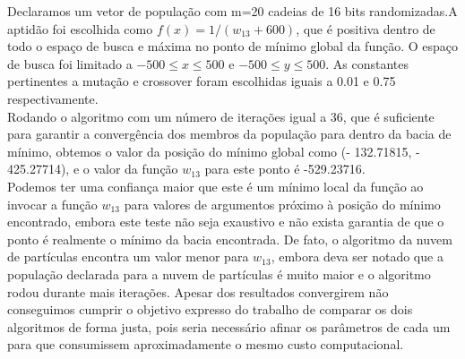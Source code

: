 
Declaramos um vetor de população com m=20 cadeias de 16 bits randomizadas.A aptidão foi escolhida como $f(x) = 1/(w_{13}+600)$, que é positiva dentro de todo o espaço de busca e máxima no ponto de mínimo global da função. O espaço de busca foi limitado a $-500 \leq x \leq 500$ e $-500 \leq y \leq 500$. As constantes pertinentes a mutação e crossover foram escolhidas iguais a 0.01 e 0.75 respectivamente.\\

Rodando o algoritmo com um número de iterações igual a 36, que é suficiente para garantir a convergência dos membros da população para dentro da bacia de mínimo, obtemos o valor da posição do mínimo global como (- 132.71815, - 425.27714), e o valor da função $w_{13}$ para este ponto é -529.23716.\\

Podemos ter uma confiança maior que este é um mínimo local da função ao invocar a função $w_{13}$ para valores de argumentos próximo à posição do mínimo encontrado, embora este teste não seja exaustivo e não exista garantia de que o ponto é realmente o mínimo da bacia encontrada. De fato, o algoritmo da nuvem de partículas encontra um valor menor para $w_{13}$, embora deva ser notado que a população declarada para a nuvem de partículas é muito maior e o algoritmo rodou durante mais iterações. Apesar dos resultados convergirem não conseguimos cumprir o objetivo expresso do trabalho de comparar os dois algoritmos de forma justa, pois seria necessário afinar os parâmetros de cada um para que consumissem aproximadamente o mesmo custo computacional. \\ 